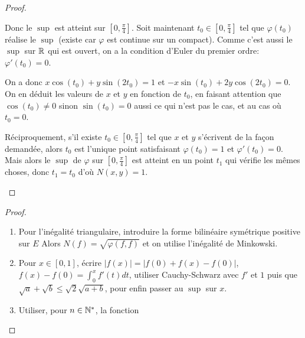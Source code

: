 \begin{proof}
\begin{enumerate}
		Donc le $\sup$ est atteint sur $[0,\frac{\pi}{4}]$. Soit maintenant $t_{0}\in[0,\frac{\pi}{4}]$ tel que $\varphi(t_{0})$ réalise le $\sup$ (existe car $\varphi$ est continue sur un compact). Comme c'est aussi le $\sup$ sur $\mathbb{R}$ qui est ouvert, on a la condition d'Euler du premier ordre: $\varphi'(t_{0})=0$.

		On a donc $x\cos(t_{0})+y\sin(2t_{0})=1$ et $-x\sin(t_{0})+2y\cos(2t_{0})=0$. On en déduit les valeurs de $x$ et $y$ en fonction de $t_{0}$, en faisant attention que $\cos(t_{0})\neq0$ sinon $\sin(t_{0})=0$ aussi ce qui n'est pas le cas, et au cas où $t_{0}=0$.

		Réciproquement, s'il existe $t_{0}\in[0,\frac{\pi}{4}]$ tel que $x$ et $y$ s'écrivent de la façon demandée, alors $t_{0}$ est l'unique point satisfaisant $\varphi(t_{0})=1$ et $\varphi'(t_{0})=0$. Mais alors le $\sup$ de $\varphi$ sur $[0,\frac{\pi}{4}]$ est atteint en un point $t_{1}$ qui vérifie les mêmes choses, donc $t_{1}=t_{0}$ d'où $N(x,y)=1$.
	\end{enumerate}
\end{proof}

\begin{proof}
	\phantom{}
	\begin{enumerate}
		\item Pour l'inégalité triangulaire, introduire la forme bilinéaire symétrique positive sur $E$ 
		Alors $N(f)=\sqrt{\varphi(f,f)}$ et on utilise l'inégalité de Minkowski.
		\item Pour $x\in[0,1]$, écrire $\vert f(x)\vert=\vert f(0)+f(x)-f(0)\vert$, $f(x)-f(0)=\int_{0}^{x}f'(t)dt$, utiliser Cauchy-Schwarz avec $f'$ et $1$ puis que $\sqrt{a}+\sqrt{b}\leqslant\sqrt{2}\sqrt{a+b}$, pour enfin passer au $\sup$ sur $x$.
		\item Utiliser, pour $n\in\mathbb{N}^{*}$, la fonction 
	\end{enumerate}
\end{proof}

